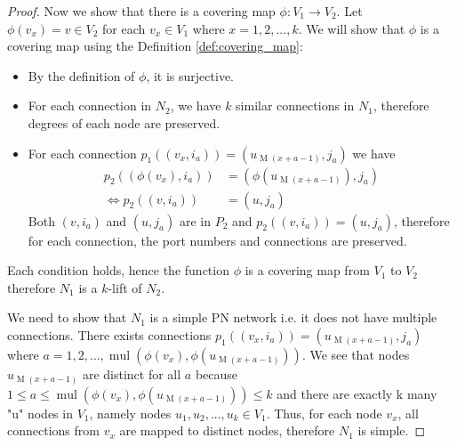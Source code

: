 \begin{proof}
    Now we show that there is a covering map $\phi: V_1 \rightarrow V_2$.
    Let $\phi(v_x) = v \in V_2$ for each $v_x \in V_1$ where $x=1, 2, ..., k$.
    We will show that $\phi$ is a covering map using the Definition \ref{def:covering_map}:
    \begin{itemize}
        \item By the definition of $\phi$, it is surjective.
        \item For each connection in $N_2$, we have $k$ similar connections in $N_1$, therefore degrees of each node are preserved.
        \item For each connection $p_1((v_{x}, i_a)) = (u_{\operatorname{M}(x+a-1)}, j_a)$ we have
        \begin{align*}
           p_2((\phi(v_{x}), i_a)) &= (\phi(u_{\operatorname{M}(x+a-1)}), j_a)\\
           \Leftrightarrow p_2((v, i_a)) &= (u, j_a)
        \end{align*}
        Both $(v, i_a)$ and $(u, j_a)$ are in $P_2$ and $p_2((v, i_a)) = (u, j_a)$, therefore for each connection, the port numbers and connections are preserved.
    \end{itemize}
    Each condition holds, hence the function $\phi$ is a covering map from $V_1$ to $V_2$
    therefore $N_1$ is a $k$-lift of $N_2$.

    We need to show that $N_1$ is a simple PN network i.e. it does not have multiple connections.
    There exists connections $p_1((v_{x}, i_a)) = (u_{\operatorname{M}(x+a-1)}, j_a)$ where $a=1, 2, ..., \operatorname{mul}(\phi(v_{x}),\phi(u_{\operatorname{M}(x+a-1)}))$.
    We see that nodes $u_{\operatorname{M}(x+a-1)}$ are distinct for all $a$ because $1 \leq a \leq \operatorname{mul}(\phi(v_{x}),\phi(u_{\operatorname{M}(x+a-1)})) \leq k$ and
    there are exactly k many "u" nodes in $V_1$, namely nodes $u_1, u_2, ..., u_k \in V_1$.
    Thus, for each node $v_x$, all connections from $v_x$ are mapped to distinct nodes, therefore $N_1$ is simple.


\end{proof}
